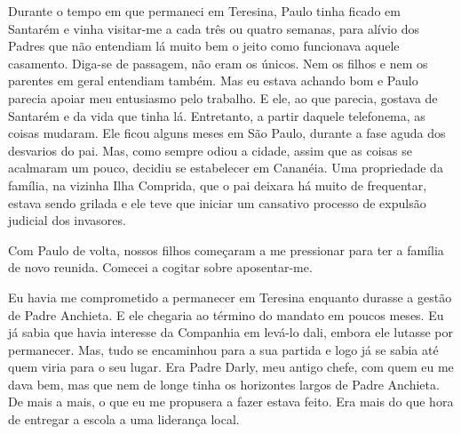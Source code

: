 Durante o tempo em que permaneci em Teresina, Paulo tinha ficado em Santarém e vinha visitar-me a cada três ou quatro semanas, para alívio dos Padres que não entendiam lá muito bem o jeito como funcionava aquele casamento.
Diga-se de passagem, não eram os únicos.
Nem os filhos e nem os parentes em geral entendiam também.
Mas eu estava achando bom e Paulo parecia apoiar meu entusiasmo pelo trabalho.
E ele, ao que parecia, gostava de Santarém e da vida que tinha lá.
Entretanto, a partir daquele telefonema, as coisas mudaram.
Ele ficou alguns meses em São Paulo, durante a fase aguda dos desvarios do pai.
Mas, como sempre odiou a cidade, assim que as coisas se acalmaram um pouco, decidiu se estabelecer em Cananéia.
Uma propriedade da família, na vizinha Ilha Comprida, que o pai deixara há muito de frequentar, estava sendo grilada e ele teve que iniciar um cansativo processo de expulsão judicial dos invasores.

Com Paulo de volta, nossos filhos começaram a me pressionar para ter a família de novo reunida.
Comecei a cogitar sobre aposentar-me.

Eu havia me comprometido a permanecer em Teresina enquanto durasse a gestão de Padre Anchieta.
E ele chegaria ao término do mandato em poucos meses.
Eu já sabia que havia interesse da Companhia em levá-lo dali, embora ele lutasse por permanecer.
Mas, tudo se encaminhou para a sua partida e logo já se sabia até quem viria para o seu lugar.
Era Padre Darly, meu antigo chefe, com quem eu me dava bem, mas que nem de longe tinha os horizontes largos de Padre Anchieta.
De mais a mais, o que eu me propusera a fazer estava feito.
Era mais do que hora de entregar a escola a uma liderança local.

